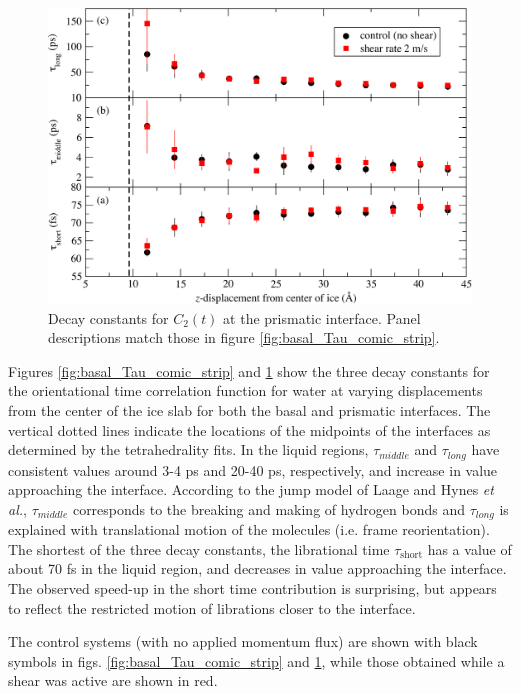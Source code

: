 \documentclass[11pt]{article}
\begin{document}
\begin{doublespace}
\begin{figure}
\includegraphics[width=\linewidth]{prismatic_Tau_comic_strip}
\caption{\label{fig:prismatic_Tau_comic_strip}
 Decay constants for $C_2(t)$ at the prismatic interface.  Panel
  descriptions match those in figure \ref{fig:basal_Tau_comic_strip}.}
\end{figure}

Figures \ref{fig:basal_Tau_comic_strip} and
\ref{fig:prismatic_Tau_comic_strip} show the three decay constants for
the orientational time correlation function for water at varying
displacements from the center of the ice slab for both the basal and
prismatic interfaces.  The vertical dotted lines indicate the
locations of the midpoints of the interfaces as determined by the
tetrahedrality fits. In the liquid regions, $\tau_{middle}$ and
$\tau_{long}$ have consistent values around 3-4 ps and 20-40 ps,
respectively, and increase in value approaching the interface.
According to the jump model of Laage and Hynes {\em et
  al.},\cite{Laage08,Laage11} $\tau_{middle}$ corresponds to the
breaking and making of hydrogen bonds and $\tau_{long}$ is explained
with translational motion of the molecules (i.e. frame reorientation).
The shortest of the three decay constants, the librational time
$\tau_\mathrm{short}$ has a value of about 70 fs in the liquid region,
and decreases in value approaching the interface. The observed
speed-up in the short time contribution is surprising, but appears to
reflect the restricted motion of librations closer to the interface.

The control systems (with no applied momentum flux) are shown with
black symbols in figs. \ref{fig:basal_Tau_comic_strip} and
\ref{fig:prismatic_Tau_comic_strip}, while those obtained while a
shear was active are shown in red.


\end{doublespace}
\end{document}
